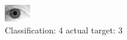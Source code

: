 \begin{figure}[h!]
\begin{center}
\includegraphics[width=0.60\columnwidth]{figures/ID2151_class_4_target_3.png}
\end{center}
\caption{ Classification: 4 actual target: 3}
\label{fig:ID2151_class_4_target_3}
\end{figure}
